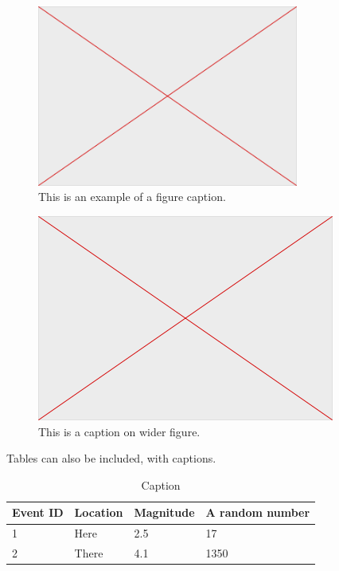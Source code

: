 \documentclass[]{seismica}
\begin{document}
	\begin{figure}[ht!]
		\includegraphics[width=8.6cm]{empty} 
		\caption{This is an example of a figure caption.}
		\label{fig:1}
	\end{figure}
	
	\begin{figure}[ht!]
		\centering
		\includegraphics[width=\textwidth]{empty} 
		\caption{This is a caption on wider figure.}
		\label{fig:2}
	\end{figure}
	
	
	Tables can also be included, with captions.
		\begin{table}[ht!]
			\begin{tabular}{llll}
				Event ID    & Location & Magnitude & A random number \\
				\hline
				1 & Here & 2.5 & 17 \\
				2 & There & 4.1 & 1350 \\
			\end{tabular}
			\caption{Caption}
			\label{tab:1}
		\end{table}
		
\end{document}
